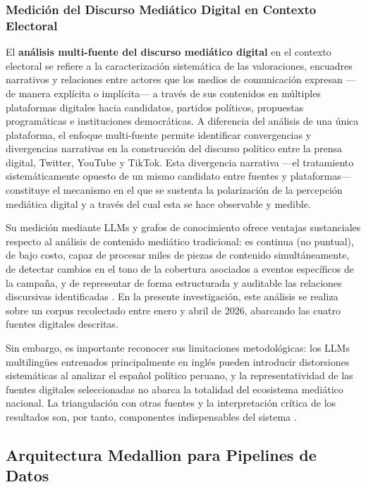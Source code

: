 \subsubsection{Medición del Discurso Mediático Digital en Contexto Electoral}

El \textbf{análisis multi-fuente del discurso mediático digital} en el contexto electoral se refiere a la caracterización sistemática de las valoraciones, encuadres narrativos y relaciones entre actores que los medios de comunicación expresan —de manera explícita o implícita— a través de sus contenidos en múltiples plataformas digitales hacia candidatos, partidos políticos, propuestas programáticas e instituciones democráticas. A diferencia del análisis de una única plataforma, el enfoque multi-fuente permite identificar convergencias y divergencias narrativas en la construcción del discurso político entre la prensa digital, Twitter, YouTube y TikTok. Esta divergencia narrativa —el tratamiento sistemáticamente opuesto de un mismo candidato entre fuentes y plataformas— constituye el mecanismo en el que se sustenta la polarización de la percepción mediática digital y a través del cual esta se hace observable y medible.

Su medición mediante LLMs y grafos de conocimiento ofrece ventajas sustanciales respecto al análisis de contenido mediático tradicional: es continua (no puntual), de bajo costo, capaz de procesar miles de piezas de contenido simultáneamente, de detectar cambios en el tono de la cobertura asociados a eventos específicos de la campaña, y de representar de forma estructurada y auditable las relaciones discursivas identificadas \parencite{pr_gujral2024llm_elections}. En la presente investigación, este análisis se realiza sobre un corpus recolectado entre enero y abril de 2026, abarcando las cuatro fuentes digitales descritas.

Sin embargo, es importante reconocer sus limitaciones metodológicas: los LLMs multilingües entrenados principalmente en inglés pueden introducir distorsiones sistemáticas al analizar el español político peruano, y la representatividad de las fuentes digitales seleccionadas no abarca la totalidad del ecosistema mediático nacional. La triangulación con otras fuentes y la interpretación crítica de los resultados son, por tanto, componentes indispensables del sistema \parencite{pr_gujral2024llm_elections}.

\subsection{Arquitectura Medallion para Pipelines de Datos}

